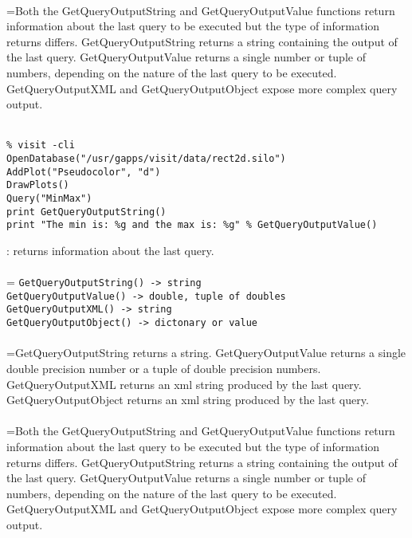 \documentclass[10pt,a4paper]{report}
\begin{document}
 \\ 
\hangindent=\parindent Both the GetQueryOutputString and GetQueryOutputValue functions return information about the last query to be executed but the type of information returns differs. GetQueryOutputString returns a string containing the output of the last query. GetQueryOutputValue returns a single number or tuple of numbers, depending on the nature of the last query to be executed.  GetQueryOutputXML and GetQueryOutputObject expose more complex query output. \\[-3mm] 

\\[-6mm]
\begin{verbatim}% visit -cli
OpenDatabase("/usr/gapps/visit/data/rect2d.silo")
AddPlot("Pseudocolor", "d")
DrawPlots()
Query("MinMax")
print GetQueryOutputString()
print "The min is: %g and the max is: %g" % GetQueryOutputValue()
\end{verbatim}
\newpage


{}
: returns information about the last query.\\[-3mm]

 \\ 
\hangindent=\parindent 
\verb!GetQueryOutputString() -> string!\\ 
\verb!GetQueryOutputValue() -> double, tuple of doubles!\\ 
\verb!GetQueryOutputXML() -> string!\\ 
\verb!GetQueryOutputObject() -> dictonary or value!\\ [-3mm]

 \\ 
\hangindent=\parindent GetQueryOutputString returns a string. GetQueryOutputValue returns a single double precision number or a tuple of double precision numbers. GetQueryOutputXML returns an xml string produced by the last query. GetQueryOutputObject returns an xml string produced by the last query. \\[-3mm] 

 \\ 
\hangindent=\parindent Both the GetQueryOutputString and GetQueryOutputValue functions return information about the last query to be executed but the type of information returns differs. GetQueryOutputString returns a string containing the output of the last query. GetQueryOutputValue returns a single number or tuple of numbers, depending on the nature of the last query to be executed.  GetQueryOutputXML and GetQueryOutputObject expose more complex query output. \\[-3mm] 
\end{document}
